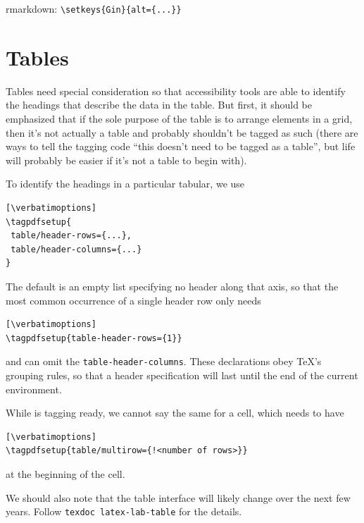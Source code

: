 \documentclass{ltugboat}
\newcommand{\verbatimoptions}{\IfDocumentMetadataT{setup-code=}\small}
\begin{document}
rmarkdown: \verb|\setkeys{Gin}{alt={...}}|

\section{Tables}

Tables need special consideration so that accessibility tools
are able to identify the headings that describe the data in the table.
But first, it should be emphasized that if the sole purpose of the table
is to arrange elements in a grid,
then it's not actually a table and probably shouldn't be tagged as such
(there are ways to tell the tagging code
``this doesn't need to be tagged as a table'',
but life will probably be easier if it's not a table to begin with).

To identify the headings in a particular tabular, we use
\begin{verbatim}[\verbatimoptions]
\tagpdfsetup{
 table/header-rows={...},
 table/header-columns={...}
}
\end{verbatim}
The default is an empty list specifying no header along that axis,
so that the most common occurrence of a single header row only needs
\begin{verbatim}[\verbatimoptions]
\tagpdfsetup{table-header-rows={1}}
\end{verbatim}
and can omit the \texttt{table-header-columns}.
These declarations obey \TeX's grouping rules, so that a header
specification will last until the end of the current environment.

While  is tagging ready, we cannot say the same for
a  cell, which needs to have
%
%
\renewcommand{\verbatimoptions}{%
\IfDocumentMetadataT{setup-code=}\small\makevmeta
}
\begin{verbatim}[\verbatimoptions]
\tagpdfsetup{table/multirow={!<number of rows>}}
\end{verbatim}
at the beginning of the cell.

We should also note that the table interface
will likely change over the next few years.
Follow \texttt{texdoc latex-lab-table} for the details.
\end{document}
